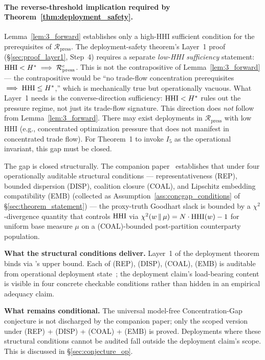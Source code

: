 \paragraph{The reverse-threshold implication required by Theorem~\ref{thm:deployment_safety}.}
Lemma~\ref{lem:3_forward} establishes only a high-HHI sufficient
condition for the prerequisites of $\mathcal{R}_{\mathrm{press}}$.
The deployment-safety theorem's Layer~1 proof
(\S\ref{sec:proof_layer1}, Step~4) requires a separate
\emph{low-HHI sufficiency} statement: $\mathrm{HHI} < H^* \implies
\mathcal{R}_{\mathrm{press}}^c$.  This is not the contrapositive
of Lemma~\ref{lem:3_forward} --- the contrapositive would be ``no
trade-flow concentration prerequisites $\implies \mathrm{HHI} \leq H^*$,''
which is mechanically true but operationally vacuous.  What
Layer~1 needs is the converse-direction sufficiency:
$\mathrm{HHI} < H^*$ rules out the pressure regime, not just its
trade-flow signature.  This direction does \emph{not} follow from
Lemma~\ref{lem:3_forward}.  There may exist deployments in
$\mathcal{R}_{\mathrm{press}}$ with low HHI (e.g., concentrated
optimization pressure that does not manifest in concentrated trade
flow).  For Theorem~1 to invoke $I_5$ as the operational invariant,
this gap must be closed.

The gap is closed structurally. The companion
paper~\citep{lasser2026foundations} establishes that under four
operationally auditable structural conditions ---
representativeness (REP), bounded dispersion (DISP), coalition
closure (COAL), and Lipschitz embedding compatibility (EMB)
(collected as Assumption~\ref{ass:concgap_conditions} of
\S\ref{sec:theorem_statement}) --- the proxy-truth Goodhart
slack is bounded by a $\chi^2$-divergence quantity that controls
$\mathrm{HHI}$ via $\chi^2(w \,\|\, \mu) = N \cdot \mathrm{HHI}(w) - 1$ for
uniform base measure $\mu$ on a (COAL)-bounded post-partition
counterparty population.

\textbf{What the structural conditions deliver.}  Layer~1 of the
deployment theorem binds via
\citep[Theorem~2]{lasser2026foundations}'s upper bound.  Each of (REP),
(DISP), (COAL), (EMB) is auditable from operational deployment
state~\citep[\S 6]{lasser2026foundations}; the deployment claim's
load-bearing content is visible in four concrete checkable
conditions rather than hidden in an empirical adequacy claim.

\textbf{What remains conditional.}  The universal model-free
Concentration-Gap conjecture is not discharged by the companion
paper; only the scoped version under (REP) + (DISP) + (COAL) +
(EMB) is proved.  Deployments where these structural conditions
cannot be audited fall outside the deployment claim's scope.
This is discussed in \S\ref{sec:conjecture_op}.

